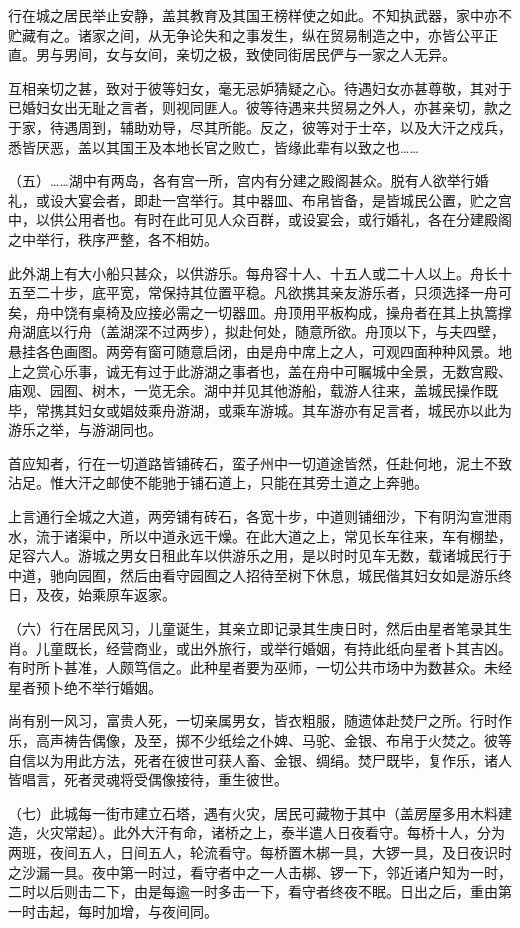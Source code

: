 \documentclass[12pt,UTF8]{ctexbook}
\begin{document}
行在城之居民举止安静，盖其教育及其国王榜样使之如此。不知执武器，家中亦不贮藏有之。诸家之间，从无争论失和之事发生，纵在贸易制造之中，亦皆公平正直。男与男间，女与女间，亲切之极，致使同街居民俨与一家之人无异。

互相亲切之甚，致对于彼等妇女，毫无忌妒猜疑之心。待遇妇女亦甚尊敬，其对于已婚妇女出无耻之言者，则视同匪人。彼等待遇来共贸易之外人，亦甚亲切，款之于家，待遇周到，辅助劝导，尽其所能。反之，彼等对于士卒，以及大汗之戍兵，悉皆厌恶，盖以其国王及本地长官之败亡，皆缘此辈有以致之也……

（五）……湖中有两岛，各有宫一所，宫内有分建之殿阁甚众。脱有人欲举行婚礼，或设大宴会者，即赴一宫举行。其中器皿、布帛皆备，是皆城民公置，贮之宫中，以供公用者也。有时在此可见人众百群，或设宴会，或行婚礼，各在分建殿阁之中举行，秩序严整，各不相妨。

此外湖上有大小船只甚众，以供游乐。每舟容十人、十五人或二十人以上。舟长十五至二十步，底平宽，常保持其位置平稳。凡欲携其亲友游乐者，只须选择一舟可矣，舟中饶有桌椅及应接必需之一切器皿。舟顶用平板构成，操舟者在其上执篙撑舟湖底以行舟（盖湖深不过两步），拟赴何处，随意所欲。舟顶以下，与夫四壁，悬挂各色画图。两旁有窗可随意启闭，由是舟中席上之人，可观四面种种风景。地上之赏心乐事，诚无有过于此游湖之事者也，盖在舟中可瞩城中全景，无数宫殿、庙观、园囿、树木，一览无余。湖中并见其他游船，载游人往来，盖城民操作既毕，常携其妇女或娼妓乘舟游湖，或乘车游城。其车游亦有足言者，城民亦以此为游乐之举，与游湖同也。

首应知者，行在一切道路皆铺砖石，蛮子州中一切道途皆然，任赴何地，泥土不致沾足。惟大汗之邮使不能驰于铺石道上，只能在其旁土道之上奔驰。

上言通行全城之大道，两旁铺有砖石，各宽十步，中道则铺细沙，下有阴沟宣泄雨水，流于诸渠中，所以中道永远干燥。在此大道之上，常见长车往来，车有棚垫，足容六人。游城之男女日租此车以供游乐之用，是以时时见车无数，载诸城民行于中道，驰向园囿，然后由看守园囿之人招待至树下休息，城民偕其妇女如是游乐终日，及夜，始乘原车返家。

（六）行在居民风习，儿童诞生，其亲立即记录其生庚日时，然后由星者笔录其生肖。儿童既长，经营商业，或出外旅行，或举行婚姻，有持此纸向星者卜其吉凶。有时所卜甚准，人颇笃信之。此种星者要为巫师，一切公共市场中为数甚众。未经星者预卜绝不举行婚姻。

尚有别一风习，富贵人死，一切亲属男女，皆衣粗服，随遗体赴焚尸之所。行时作乐，高声祷告偶像，及至，掷不少纸绘之仆婢、马驼、金银、布帛于火焚之。彼等自信以为用此方法，死者在彼世可获人畜、金银、绸绢。焚尸既毕，复作乐，诸人皆唱言，死者灵魂将受偶像接待，重生彼世。

（七）此城每一街市建立石塔，遇有火灾，居民可藏物于其中（盖房屋多用木料建造，火灾常起）。此外大汗有命，诸桥之上，泰半遣人日夜看守。每桥十人，分为两班，夜间五人，日间五人，轮流看守。每桥置木梆一具，大锣一具，及日夜识时之沙漏一具。夜中第一时过，看守者中之一人击梆、锣一下，邻近诸户知为一时，二时以后则击二下，由是每逾一时多击一下，看守者终夜不眠。日出之后，重由第一时击起，每时加增，与夜间同。
\end{document}
